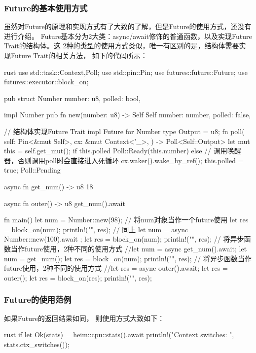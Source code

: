 \subsubsection{Future的基本使用方式}
虽然对Future的原理和实现方式有了大致的了解，但是Future的使用方式，还没有进行介绍。
Future基本分为2大类：async/await修饰的普通函数，以及实现Future Trait的结构体。这
2种的类型的使用方式类似，唯一有区别的是，结构体需要实现Future Trait的相关方法，
如下的代码所示：
\begin{code-block}{rust}
use std::task::{Context,Poll};
use std::pin::Pin;
use futures::future::Future;
use futures::executor::block_on;

pub struct Number {
    number: u8,
    polled: bool,
}

impl Number {
    pub fn new(number: u8) -> Self {
       Self {
            number: number,
            polled: false,
       }
    }
}

// 结构体实现Future Trait
impl Future for Number {
    type Output = u8;
    fn poll(
       self: Pin<&mut Self>,
       cx: &mut Context<'_>,
    ) -> Poll<Self::Output> {
        let mut this = self.get_mut();
        if this.polled {
            Poll::Ready(this.number)
        } else {
            // 调用唤醒器，否则调用poll时会直接进入死循环
            cx.waker().wake_by_ref();
            this.polled = true;
            Poll::Pending
        }
    }
}

async fn get_num() -> u8 {
    18
}

async fn outer() -> u8 {
    get_num().await
}

fn main(){
    let num = Number::new(98);
    // 将num对象当作一个future使用
    let res = block_on(num);
    println!("{}", res);
    // 同上
    let num = async { Number::new(100).await };
    let res = block_on(num);
    println!("{}", res);
    // 将异步函数当作future使用，2种不同的使用方式
    //let num = async {get_num().await};
    let num = get_num();
    let res = block_on(num);
    println!("{}", res);
    // 将异步函数当作future使用，2种不同的使用方式
    //let res = async {outer().await};
    let res = outer();
    let res = block_on(res);
    println!("{}", res);
}
\end{code-block}

\subsubsection{Future的使用范例}
如果Future的返回结果如同，
则使用方式大致如下：
\begin{code-block}{rust}
if let Ok(stats) = heim::cpu::stats().await {
    println!("Context switches: {}", stats.ctx_switches());
}
\end{code-block}

